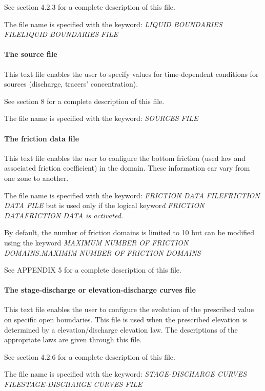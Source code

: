 \documentclass{article} %
\begin{document}
 See section 4.2.3 for a complete description of this file.

 The file name is specified with the keyword: \textit{LIQUID BOUNDARIES FILELIQUID BOUNDARIES FILE}


\paragraph{  The source file}

 This text file enables the user to specify values for time-dependent conditions for sources (discharge, tracers' concentration).

 See section 8 for a complete description of this file.

 The file name is specified with the keyword: \textit{SOURCES FILE}


\paragraph{ The friction data file}

 This text file enables the user to configure the bottom friction (used law and associated friction coefficient) in the domain. These information car vary from one zone to another.

 The file name is specified with the keyword: \textit{FRICTION DATA FILEFRICTION DATA FILE} but is used only if the logical keywor\textit{d FRICTION DATAFRICTION DATA is activated.}

 By default, the number of friction domains is limited to 10 but can be modified using the keyword \textit{MAXIMUM NUMBER OF FRICTION DOMAINS.MAXIMIM NUMBER OF FRICTION DOMAINS}

 See APPENDIX 5  for a complete description of this file.


\paragraph{ The stage-discharge or elevation-discharge curves file}

 This text file enables the user to configure the evolution of the prescribed value on specific open boundaries. This file is used when the prescribed elevation is determined by a elevation/discharge elevation law. The descriptions of the appropriate laws are given through this file.

 See section 4.2.6 for a complete description of this file.

 The file name is specified with the keyword: \textit{STAGE-DISCHARGE CURVES FILESTAGE-DISCHARGE CURVES FILE}
\end{document}
